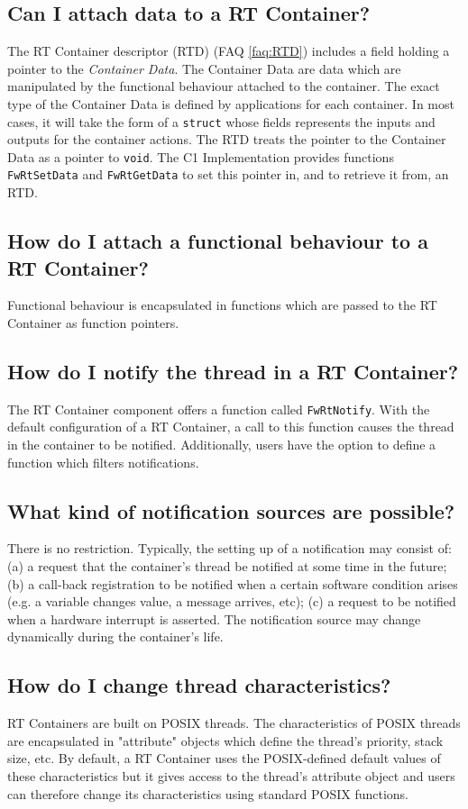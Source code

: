 \documentclass[faq]{../fwprofile}
\begin{document}
\subsection{Can I attach data to a RT Container?}\label{faq:container_data}
The RT Container descriptor (RTD) (FAQ \ref{faq:RTD}) includes a field holding a pointer to the \emph{Container Data}. The Container Data are data which are manipulated 
by the functional behaviour attached to the container. The exact type of the Container Data is defined by applications for each container. In most cases, it will take 
the form of a \texttt{struct} whose fields represents the inputs and outputs for the container actions. The RTD treats the pointer to the Container Data as a pointer to \texttt{void}. The C1 Implementation provides functions \texttt{FwRtSetData} and \texttt{FwRtGetData} to set this pointer in, and to retrieve it from, an RTD.

\subsection{How do I attach a functional behaviour to a RT Container?}
Functional behaviour is encapsulated in functions which are passed to the RT Container as function pointers. 

\subsection{How do I notify the thread in a RT Container?}
The RT Container component offers a function called \texttt{FwRtNotify}. With the default configuration of a RT Container, a call to this function causes the thread in the container to be notified. Additionally, users have the option to define a function which filters notifications. 

\subsection{What kind of notification sources are possible?}
There is no restriction. Typically, the setting up of a notification may consist of: (a) a request that the container's thread be notified at some time in the future; (b) a
call-back registration to be notified when a certain software condition arises (e.g. a variable changes value, a message arrives, etc); (c) a request to be notified when a hardware interrupt is asserted. The notification source may change dynamically during the container's life.

\subsection{How do I change thread characteristics?}
RT Containers are built on POSIX threads. The characteristics of POSIX threads are encapsulated in "attribute" objects which define the thread's priority, stack size, etc. By default, a RT Container uses the POSIX-defined default values of these characteristics but it gives access to the thread's attribute object and users can therefore change its characteristics using standard POSIX functions. 
\end{document}
